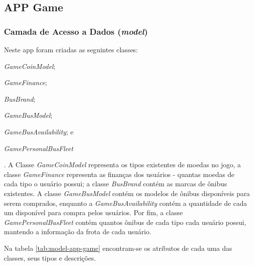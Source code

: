 \subsection{APP Game}

\subsubsection{Camada de Acesso a Dados (\textit{model})}
Neste app foram criadas as seguintes classes:
\begin{enumerate*}[label=\itshape\alph*\upshape)]
    \item \textit{GameCoinModel};
    \item \textit{GameFinance};
    \item \textit{BusBrand};
    \item \textit{GameBusModel};
    \item \textit{GameBusAvailability}; e
    \item \textit{GamePersonalBusFleet}
\end{enumerate*}.
A Classe \textit{GameCoinModel} representa os tipos existentes de moedas no jogo, a classe \textit{GameFinance} representa as finanças dos usuários - quantas moedas de cada tipo o usuário possui; a classe \textit{BusBrand} contém as marcas de ônibus existentes. A classe \textit{GameBusModel} contém os modelos de ônibus disponíveis para serem comprados, enquanto a \textit{GameBusAvailability} contém a quantidade de cada um disponível para compra pelos usuários. Por fim, a classe \textit{GamePersonalBusFleet} contém quantos ônibus de cada tipo cada usuário possui, mantendo a informação da frota de cada usuário.

Na tabela \ref{tab:model-app-game} encontram-se os atributos de cada uma das classes, seus tipos e descrições.

